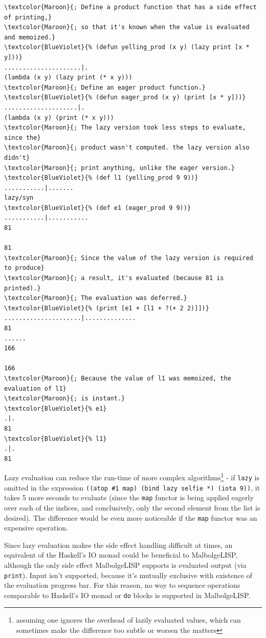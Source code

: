 \begin{Verbatim}[commandchars=\\\{\}]
\textcolor{Maroon}{; Define a product function that has a side effect of printing,}
\textcolor{Maroon}{; so that it's known when the value is evaluated and memoized.}
\textcolor{BlueViolet}{% (defun yelling_prod (x y) (lazy print [x * y]))}
.....................|.
(lambda (x y) (lazy print (* x y)))
\textcolor{Maroon}{; Define an eager product function.}
\textcolor{BlueViolet}{% (defun eager_prod (x y) (print [x * y]))}
....................|.
(lambda (x y) (print (* x y)))
\textcolor{Maroon}{; The lazy version took less steps to evaluate, since the}
\textcolor{Maroon}{; product wasn't computed. the lazy version also didn't}
\textcolor{Maroon}{; print anything, unlike the eager version.}
\textcolor{BlueViolet}{% (def l1 (yelling_prod 9 9))}
...........|.......
lazy/syn
\textcolor{BlueViolet}{% (def e1 (eager_prod 9 9))}
...........|...........
81

81
\textcolor{Maroon}{; Since the value of the lazy version is required to produce}
\textcolor{Maroon}{; a result, it's evaluated (because 81 is printed).}
\textcolor{Maroon}{; The evaluation was deferred.}
\textcolor{BlueViolet}{% (print [e1 + [l1 + ?(+ 2 2)]])}
.....................|..............
81
......
166

166
\textcolor{Maroon}{; Because the value of l1 was memoized, the evaluation of l1}
\textcolor{Maroon}{; is instant.}
\textcolor{BlueViolet}{% e1}
.|.
81
\textcolor{BlueViolet}{% l1}
.|.
81
\end{Verbatim}

\par Lazy evaluation can reduce the run-time of more complex algorithms\footnote{assuming one ignores the overhead of lazily evaluated values, which can sometimes make the difference too subtle or worsen the matters} - if \verb|lazy| is omitted in the expression \verb|((atop #1 map) (bind lazy selfie *) (iota 9))|, it takes 5 more seconds to evaluate (since the \verb|map| functor is being applied eagerly over each of the indices, and conclusively, only the second element from the list is desired). The difference would be even more noticeable if the \verb|map| functor was an expensive operation.

\par Since lazy evaluation makes the side effect handling difficult at times, an equivalent of the Haskell's IO monad could be beneficial to MalbolgeLISP, although the only side effect MalbolgeLISP supports is evaluated output (via \verb|print|). Input isn't supported, because it's mutually exclusive with existence of the evaluation progress bar. For this reason, no way to sequence operations comparable to Haskell's IO monad or \verb|do| blocks is supported in MalbolgeLISP.

